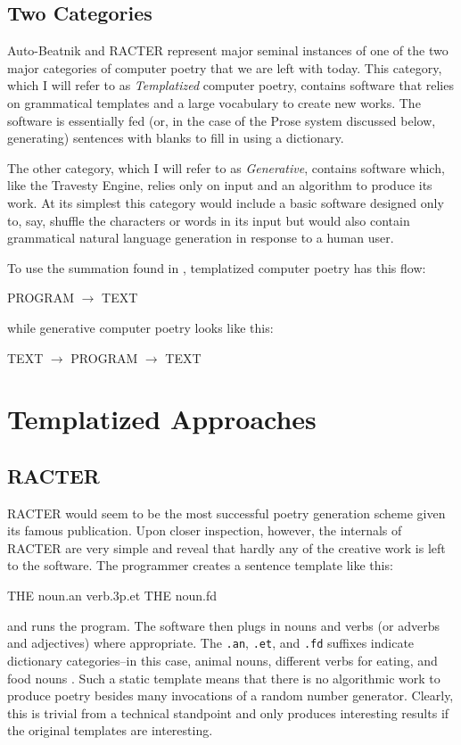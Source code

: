 \documentclass[10pt]{article}
\begin{document}
\subsection{Two Categories}
Auto-Beatnik and RACTER represent major seminal instances of one of the two
major categories of computer poetry that we are left with today. This category,
which I will refer to as \emph{Templatized} computer poetry, contains software
that relies on grammatical templates and a large vocabulary to create new
works. The software is essentially fed (or, in the case of the Prose system
discussed below, generating) sentences with blanks to fill in using a
dictionary.

The other category, which I will refer to as \emph{Generative}, contains
software which, like the Travesty Engine, relies only on input and an algorithm
to produce its work. At its simplest this category would include a basic
software designed only to, say, shuffle the characters or words in its input
but would also contain grammatical natural language generation in response to 
a human user.

To use the summation found in \cite{Hart96}, templatized computer poetry has this flow:
\begin{center}
\begin{boxed}
PROGRAM $\rightarrow$ TEXT
\end{boxed}
\end{center}
while generative computer poetry looks like this:
\begin{center}
\begin{boxed}
TEXT $\rightarrow$ PROGRAM $\rightarrow$ TEXT
\end{boxed}
\end{center}

\section{Templatized Approaches}
\subsection{RACTER}
RACTER would seem to be the most successful poetry generation scheme given its
famous publication. Upon closer inspection, however, the internals of RACTER
are very simple and reveal that hardly any of the creative work is left to the
software. The programmer creates a sentence template like this: 
\begin{center}
\begin{boxedverbatim} 
THE noun.an verb.3p.et THE noun.fd 
\end{boxedverbatim}
\end{center} 
and runs the program. The software then plugs in nouns and verbs (or adverbs
and adjectives) where appropriate. The \verb|.an|, \verb|.et|, and \verb|.fd|
suffixes indicate dictionary categories--in this case, animal nouns, different
verbs for eating, and food nouns \cite{Hart96}. Such a static template means that there is no
algorithmic work to produce poetry besides many invocations of a random number
generator. Clearly, this is trivial from a technical standpoint and only
produces interesting results if the original templates are interesting. 
\end{document}
